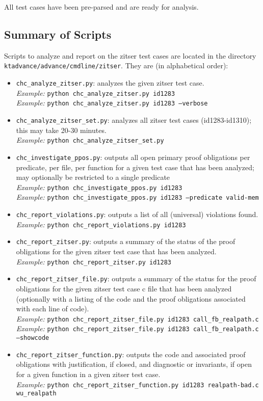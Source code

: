 \documentclass[11pt]{article}
\begin{document}
All test cases have been pre-parsed and are ready for analysis.

\subsection{Summary of Scripts}

Scripts to analyze and report on the zitser test cases are located in the
directory \\ {\tt ktadvance/advance/cmdline/zitser}. They are (in alphabetical order):
\begin{itemize}[leftmargin=*]
\item {\tt chc\_analyze\_zitser.py}: analyzes the given zitser test case.\\
\emph{Example:} {\tt python chc\_analyze\_zitser.py id1283} \\
\emph{Example:} {\tt python chc\_analyze\_zitser.py id1283 --verbose}
\item {\tt chc\_analyze\_zitser\_set.py}: analyzes all zitser test cases (id1283-id1310);
  this may take 20-30 minutes. \\
\emph{Example:} {\tt python chc\_analyze\_zitser\_set.py}
\item {\tt chc\_investigate\_ppos.py}: outputs all open primary proof obligations per 
   predicate, per file, per function for a given test case that has been analyzed; 
   may optionally be restricted to a single predicate \\
\emph{Example:} {\tt python chc\_investigate\_ppos.py id1283} \\
\emph{Example:} {\tt python chc\_investigate\_ppos.py id1283 --predicate valid-mem}
\item {\tt chc\_report\_violations.py}: outputs a list of all (universal) violations
   found.\\
\emph{Example:} {\tt python chc\_report\_violations.py id1283}
\item {\tt chc\_report\_zitser.py}: outputs a summary of the status of the proof 
   obligations for the given zitser test case that has been analyzed.\\
\emph{Example:} {\tt python chc\_report\_zitser.py id1283}
\item {\tt chc\_report\_zitser\_file.py}: outputs a summary of the status for the
  proof obligations for the given zitser test case c file that has been analyzed
  (optionally with a listing of the code and the proof obligations associated with
  each line of code).\\
\emph{Example:} {\tt python chc\_report\_zitser\_file.py id1283 call\_fb\_realpath.c} \\
\emph{Example:} {\tt python chc\_report\_zitser\_file.py id1283 call\_fb\_realpath.c --showcode}
\item {\tt chc\_report\_zitser\_function.py}: outputs the code and associated proof
  obligations with justification, if closed, and diagnostic or invariants, if open
  for a given function in a given zitser test case.\\
\emph{Example:} {\tt python chc\_report\_zitser\_function.py id1283 realpath-bad.c wu\_realpath}
   
\end{itemize}
\end{document}
